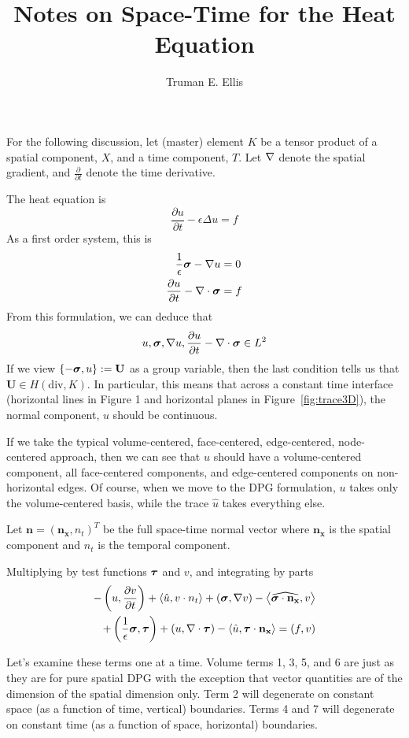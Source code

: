 \documentclass{article}
\author{Truman E. Ellis}
\title{Notes on Space-Time for the Heat Equation}
\begin{document}
\maketitle

For the following discussion, let (master) element $K$ be a tensor product of a spatial
component, $X$, and a time component, $T$. Let $\nabla$ denote the spatial
gradient, and $\frac{\partial}{\partial t}$ denote the time derivative.

The heat equation is
\[
\frac{\partial u}{\partial t}-\epsilon\Delta u=f
\]
As a first order system, this is
\begin{align*}
  \frac{1}{\epsilon}\boldsymbol\sigma-\nabla u&=0\\
  \frac{\partial u}{\partial t}-\nabla\cdot\boldsymbol\sigma&=f
\end{align*}
From this formulation, we can deduce that
\[
u,\boldsymbol\sigma,\nabla u,\frac{\partial u}{\partial t}-\nabla\cdot\boldsymbol\sigma\in L^2
\]
If we view $\{-\boldsymbol\sigma,u\}:=\mathbf{U}$ as a group variable, then the last
condition tells us that $\mathbf{U}\in H(\mathrm{div},K)$. In particular, this
means that across a constant time interface (horizontal lines in Figure 1 and
horizontal planes in Figure~\ref{fig:trace3D}), the normal component, $u$ should be continuous.

If we take the typical volume-centered, face-centered, edge-centered,
node-centered approach, then we can see that $u$ should have a volume-centered
component, all face-centered components, and edge-centered components on
non-horizontal edges. Of course, when we move to the DPG formulation, $u$
takes only the volume-centered basis, while the trace $\hat u$ takes
everything else.

Let $\mathbf{n}=(\mathbf{n_x},n_t)^T$ be the full space-time normal vector
where $\mathbf{n_x}$ is the spatial component and $n_t$ is the temporal
component.

Multiplying by test functions $\boldsymbol\tau$ and $v$, and integrating by parts
\begin{align*}
-\left( u,\frac{\partial v}{\partial t} \right)
+\left\langle \hat u,v\cdot n_t \right\rangle
+\left( \boldsymbol\sigma,\nabla v \right)
-\left\langle \widehat{\boldsymbol\sigma\cdot\mathbf{n_x}}, v \right\rangle\\
+\left( \frac{1}{\epsilon}\boldsymbol\sigma,\boldsymbol\tau \right)
+\left( u,\nabla\cdot\boldsymbol\tau \right)
-\left\langle \hat u,\boldsymbol\tau\cdot\mathbf{n_x} \right\rangle
=\left( f,v \right)
\end{align*}

Let's examine these terms one at a time. Volume terms 1, 3, 5, and 6 are just
as they are for pure spatial DPG with the exception that vector quantities are
of the dimension of the spatial dimension only. Term 2 will degenerate on
constant space (as a function of time, vertical) boundaries. Terms 4 and 7 will
degenerate on constant time (as a function of space, horizontal) boundaries.
\end{document}
